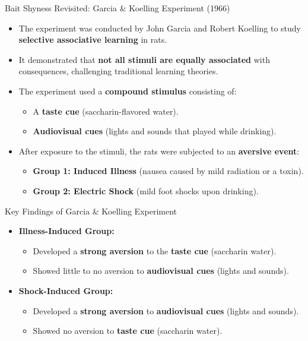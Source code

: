 \documentclass{beamer}
\begin{document}
\begin{frame}{Bait Shyness Revisited: Garcia \& Koelling Experiment (1966)}
    \begin{itemize}
        \item The experiment was conducted by John Garcia and Robert Koelling to study \textbf{selective associative learning} in rats.
        \item It demonstrated that \textbf{not all stimuli are equally associated} with consequences, challenging traditional learning theories.
        \item The experiment used a \textbf{compound stimulus} consisting of:
        \begin{itemize}
            \item A \textbf{taste cue} (saccharin-flavored water).
            \item \textbf{Audiovisual cues} (lights and sounds that played while drinking).
        \end{itemize}
        \item After exposure to the stimuli, the rats were subjected to an \textbf{aversive event}:
        \begin{itemize}
            \item \textbf{Group 1: Induced Illness} (nausea caused by mild radiation or a toxin).
            \item \textbf{Group 2: Electric Shock} (mild foot shocks upon drinking).
        \end{itemize}
    \end{itemize}
\end{frame}

\begin{frame}{Key Findings of Garcia \& Koelling Experiment }
    \begin{itemize}
        \item \textbf{Illness-Induced Group:}
        \begin{itemize}
            \item Developed a \textbf{strong aversion} to the \textbf{taste cue} (saccharin water).
            \item Showed little to no aversion to \textbf{audiovisual cues} (lights and sounds).
        \end{itemize}
        \item \textbf{Shock-Induced Group:}
        \begin{itemize}
            \item Developed a \textbf{strong aversion} to \textbf{audiovisual cues} (lights and sounds).
            \item Showed no aversion to \textbf{taste cue} (saccharin water).
        \end{itemize}
    \end{itemize}
\end{frame}
\end{document}
